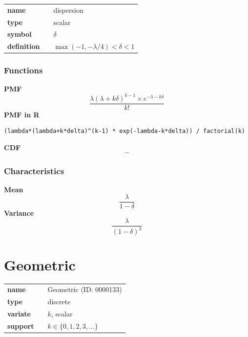 \noindent\begin{tabular}{p{2cm}cl}
\textbf{name} & & dispersion \\
\textbf{type} & & scalar \\
\textbf{symbol} & & $\delta$  \\
\textbf{definition} & & $\max(-1,-\lambda/4) < \delta < 1$
\end{tabular}
\subsubsection*{Functions}

\smallskip \noindent \hspace{.2cm} \textbf{PMF} 
\begin{equation*}\frac{\lambda (\lambda+k\delta)^{k-1}\times e^{-\lambda - k \delta}}{k!}\end{equation*}
\smallskip \noindent \hspace{.2cm} \textbf{PMF in R}  
\begin{verbatim}(lambda*(lambda+k*delta)^(k-1) * exp(-lambda-k*delta)) / factorial(k)\end{verbatim}
\smallskip \noindent \hspace{.2cm} \textbf{CDF} 
\begin{equation*}-\end{equation*}
\smallskip
\subsubsection*{Characteristics}
\smallskip \noindent \hspace{.2cm} \textbf{Mean} 
\begin{equation*}\frac{\lambda}{1 -\delta}\end{equation*}
\smallskip \noindent \hspace{.2cm} \textbf{Variance} 
\begin{equation*}\frac{\lambda}{(1 -\delta)^3}\end{equation*}
\smallskip
\section*{Geometric} 

  \bigskip 

\begin{tabular}{p{2cm}cl}
\textbf{name} & & Geometric (ID: 0000133)\\ 
 
\textbf{type} & & discrete \\ 

\textbf{variate} & & $k
$, scalar \\ 

\textbf{support} & & $k \in \{0,1,2,3,\dots\}$
\end{tabular}


